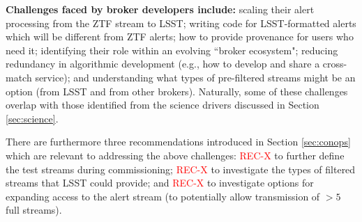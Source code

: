 {\bf Challenges faced by broker developers include:} scaling their alert processing from the  {ZTF} stream to  {LSST}; writing code for  {LSST}-formatted alerts which will be different from  {ZTF} alerts; how to provide  {provenance} for users who need it; identifying their role within an evolving ``broker ecosystem"; reducing redundancy in algorithmic development (e.g., how to develop and share a cross-match service); and understanding what types of pre-filtered streams might be an option (from  {LSST} and from other brokers).
Naturally, some of these challenges overlap with those identified from the science drivers discussed in Section \ref{sec:science}.




There are furthermore three recommendations introduced in Section \ref{sec:conops} which are relevant to addressing the above challenges: \textcolor{red}{REC-X} to further define the test streams during commissioning; \textcolor{red}{REC-X} to investigate the types of filtered streams that  {LSST} could provide; and \textcolor{red}{REC-X} to investigate options for expanding access to the alert stream (to potentially allow transmission of $>5$ full streams).




